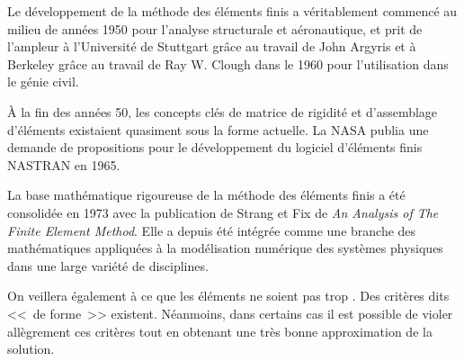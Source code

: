 \begin{histoire}
\medskip
{}

\medskip
Le développement de la méthode des éléments finis a véritablement commencé au milieu de années 1950 pour l'analyse
structurale et aéronautique, et prit de l'ampleur à l'Université de Stuttgart grâce au travail de
John Argyris et à Berkeley grâce au travail de
Ray W. Clough dans le 1960 pour l'utilisation dans
le génie civil.

\medskip
À la fin des années 50, les concepts clés de matrice de rigidité et d'assemblage d'éléments existaient
quasiment sous la forme actuelle.
La NASA publia une demande de propositions pour le développement du logiciel d'éléments finis NASTRAN en 1965.

\medskip
La base mathématique rigoureuse de la méthode des éléments finis a été consolidée en 1973 avec la publication de
Strang et
Fix de \emph{An Analysis of The Finite Element Method}.
Elle a depuis été intégrée comme une branche des mathématiques appliquées à la modélisation
numérique des systèmes physiques dans une large variété de disciplines.
\end{histoire}

On veillera également à ce que les éléments ne soient pas trop
. Des critères dits <<~de forme~>> existent. Néanmoins, dans
certains cas il est possible de violer allègrement ces critères tout en
obtenant une très bonne approximation de la solution.


